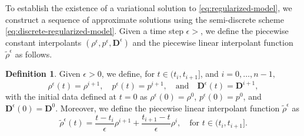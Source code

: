 \documentclass[final,reqno]{amsart}
\theoremstyle{plain}
\theoremstyle{definition}
\newtheorem{definition}{Definition}	%
\theoremstyle{remark}
\numberwithin{remark}{section}	%
\numberwithin{example}{section}	%
\newcommand{\de}{\mathbf{D}}
\begin{document}
 To establish the existence of a variational solution to  \eqref{eq:regularized-model}, we construct a sequence of approximate solutions using the semi-discrete scheme \eqref{eq:discrete-regularized-model}. Given a time step $\epsilon>$, we define the piecewise constant interpolants $(\rho^\epsilon,p^\epsilon,\de^\epsilon)$ and the piecewise linear interpolant function $\tilde{\rho}^\epsilon$ as follows.
\begin{definition}\label{def:interpolants}
Given $\epsilon >0$, we define, for $t \in (t_i, t_{i+1}]$, and $i = 0, \dots, n-1,$
\begin{equation}\label{eq:approx-sol}
	    \rho^\epsilon(t) = \rho^{i+1}, \quad p^\epsilon(t) = p^{i+1}, \quad \text{and} \quad \de^\epsilon(t) = \de^{i+1},
\end{equation}
with the initial data defined at $t=0$ as $\rho^\epsilon(0) = \rho^0$, $p^\epsilon(0) = p^0$, and $\de^\epsilon(0) = \de^0$. 
Moreover, we define the piecewise linear interpolant function $\tilde{\rho}^\epsilon$ as
\begin{equation}\label{eq:tilde-rho}
    \tilde{\rho}^\epsilon(t) = \frac{t - t_i}{\epsilon}\rho^{i+1} + \frac{t_{i+1} - t}{\epsilon}\rho^{i}, \quad \text{for } t \in (t_i, t_{i+1}].
\end{equation}
\end{definition}
\end{document}
